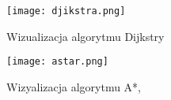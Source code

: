 \begin{figure}
\label{fig:djikstra}
\centering
\texttt{[image: djikstra.png]}
\caption{Wizualizacja algorytmu Dijkstry \cite{searchpathsimplementations}}
\end{figure}

\begin{figure}
\label{fig:astar}
\centering
\texttt{[image: astar.png]}
\caption{Wizyalizacja algorytmu A*, \cite{searchpathsimplementations}}
\end{figure}